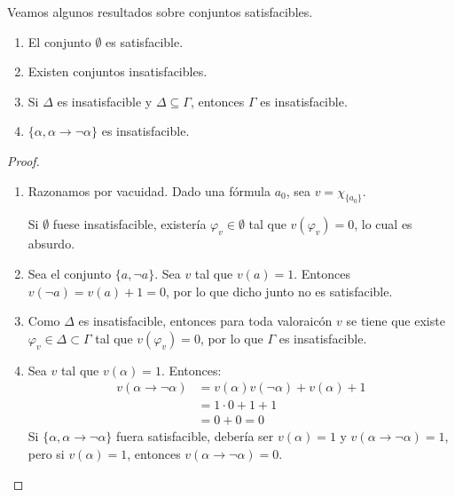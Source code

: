 \begin{prop} Veamos algunos resultados sobre conjuntos satisfacibles.

    \begin{enumerate}
        \item El conjunto $\emptyset $ es satisfacible.
        \item Existen conjuntos insatisfacibles.
        \item Si $\Delta$ es insatisfacible y $\Delta \subseteq \Gamma$, entonces $\Gamma$ es insatisfacible.
        \item $\{\alpha,\alpha\rightarrow\lnot\alpha\}$ es insatisfacible.
    \end{enumerate}
    \begin{proof}
        \ 
        \begin{enumerate}
            \item Razonamos por vacuidad. Dado una fórmula $a_0$, sea $v=\chi_{\{a_0\}}$.

            Si $\emptyset $ fuese insatisfacible, existería $\varphi_v\in \emptyset $ tal que $v(\varphi_v)=0$, lo cual es absurdo.
            
            \item Sea el conjunto $\{a, \lnot a\}$. Sea $v$ tal que $v(a)=1$. Entonces $v(\lnot a) = v(a)+1 = 0$,
            por lo que dicho junto no es satisfacible.
            
            \item Como $\Delta$ es insatisfacible, entonces para toda valoraicón $v$ se tiene que existe $\varphi_v\in \Delta\subset \Gamma$ tal que $v(\varphi_v)=0$,
            por lo que $\Gamma$ es insatisfacible.

            \item Sea $v$ tal que $v(\alpha)=1$. Entonces:
                \begin{align*}
                    v(\alpha\rightarrow\lnot\alpha)&=v(\alpha)v(\lnot\alpha)+v(\alpha)+1\\
                    &= 1\cdot 0+1+1 \\
                    &= 0 + 0 = 0
                \end{align*}
                Si $\{\alpha,\alpha\rightarrow\lnot\alpha\}$ fuera satisfacible, debería ser $v(\alpha)=1$ y $v(\alpha\rightarrow\lnot\alpha)=1$, pero si $v(\alpha)=1$, entonces $v(\alpha\rightarrow\lnot\alpha)=0$.
        \end{enumerate}
    \end{proof}
\end{prop}

